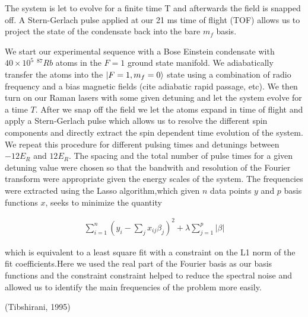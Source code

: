 The system is let to evolve for a finite time T and afterwards the field is snapped off. A Stern-Gerlach pulse applied at our 21 ms time of flight (TOF) allows us to project the state of the condensate back into the bare $m_f$ basis. 


We start our experimental sequence with a Bose Einstein condensate with $40\times 10^5$ $^{87}Rb$ atoms in the $F=1$ ground state manifold. We adiabatically transfer the atoms into the $|F=1,m_f=0\rangle$ state using a combination of radio frequency and a bias magnetic fields (cite adiabatic rapid passage, etc). We then turn on our Raman lasers with some given detuning and let the system evolve for a time $T$. After we snap off the field we let the atoms expand in time of flight and apply a Stern-Gerlach pulse which allows us to resolve the different spin components and directly extract the spin dependent time evolution of the system. We repeat this procedure for different pulsing times and detunings between $-12 E_R$ and $12 E_R$. The spacing and the total number of pulse times for a given detuning value were chosen so that the bandwith and resolution of the Fourier transform were appropriate given the energy scales of the system. The frequencies were extracted using the Lasso algorithm,which given $n$ data points $y$ and $p$ basis functions $x$, seeks to minimize the quantity

\begin{align}
	\sum_{i=1}^{n}(y_i-\sum_{j}x_{ij}\beta_j)^2+\lambda\sum_{j=1}^{p}\lvert\beta\rvert
\end{align}

which is equivalent to a least square fit with a constraint on the L1 norm of the fit coefficients.Here we used the real part of the Fourier basis as our basis functions and the constraint constraint helped to reduce the spectral noise and allowed us to identify the main frequencies of the problem more easily.


(Tibshirani, 1995)
